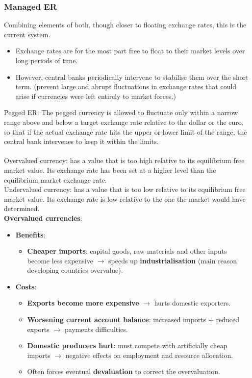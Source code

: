 \subsubsection*{Managed ER}
Combining elements of both, though closer to floating exchange rates, this is the current system. 
\begin{itemize}
  \item Exchange rates are for the most part free to float to their market levels over long periods of time.
  \item However, central banks periodically intervene to stabilise them over the short term. (prevent large and abrupt fluctuations in exchange rates that could arise if currencies were left entirely to market forces.)
\end{itemize}
Pegged ER: The pegged currency is allowed to fluctuate only within a narrow range above and below a target exchange rate relative to the dollar or the euro, so that if the actual exchange rate hits the upper or lower limit of the range, the central bank intervenes to keep it within the limits.\\\\
Overvalued currency: has a value that is too high relative to its equilibrium free market value. Its exchange rate has been set at a higher level than the equilibrium market exchange rate.\\
Undervalued currency: has a value that is too low relative to its equilibrium free market value. Its exchange rate is low relative to the one the market would have determined.\\
\textbf{Overvalued currencies}:
\begin{itemize}
  \item \textbf{Benefits}:
  \begin{itemize}
    \item \textbf{Cheaper imports}: capital goods, raw materials and other inputs become less expensive $\to$ speeds up \textbf{industrialisation} (main reason developing countries overvalue).
  \end{itemize}
  \item \textbf{Costs}:
  \begin{itemize}
    \item \textbf{Exports become more expensive} $\to$ hurts domestic exporters.
    \item \textbf{Worsening current account balance}: increased imports + reduced exports $\to$ payments difficulties.
    \item \textbf{Domestic producers hurt}: must compete with artificially cheap imports $\to$ negative effects on employment and resource allocation.
    \item Often forces eventual \textbf{devaluation} to correct the overvaluation.
  \end{itemize}
\end{itemize}
